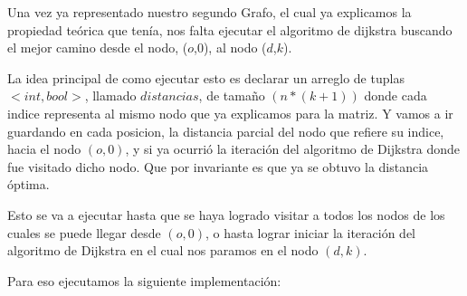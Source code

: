\documentclass{article}
\begin{document}
\par{Una vez ya representado nuestro segundo Grafo, el cual ya explicamos la propiedad teórica que tenía, nos falta ejecutar el algoritmo de dijkstra buscando el mejor camino desde el nodo, ($o$,0), al nodo ($d$,$k$).}
\par{ La idea principal de como ejecutar esto es declarar un arreglo de tuplas $<int,bool>$, llamado $distancias$, de tamaño $(n*(k+1))$ donde cada indice representa al mismo nodo que ya explicamos para la matriz. Y vamos a ir guardando en cada posicion, la distancia parcial del nodo que refiere su indice, hacia el nodo $(o,0)$, y si ya ocurrió la iteración del algoritmo de Dijkstra donde fue visitado dicho nodo. Que por invariante es que ya se obtuvo la distancia óptima.}
\par{Esto se va a ejecutar hasta que se haya logrado visitar a todos los nodos de los cuales se puede llegar desde $(o,0)$, o hasta lograr iniciar la iteración del algoritmo de Dijkstra en el cual nos paramos en el nodo $(d,k)$.}
\par{Para eso ejecutamos la siguiente implementación:}
\\
\medskip
\end{document}
